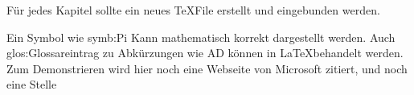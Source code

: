 Für jedes Kapitel sollte ein neues \TeX  File erstellt und eingebunden werden. \newline

Ein Symbol wie \gls{symb:Pi} Kann mathematisch korrekt dargestellt werden. Auch \gls{glos:Glossareintrag} zu Abkürzungen wie \gls{AD} können in \LaTeX behandelt werden.
Zum Demonstrieren wird hier noch eine Webseite von Microsoft zitiert\cite{SE}, und noch eine Stelle\cite{SE}


 
